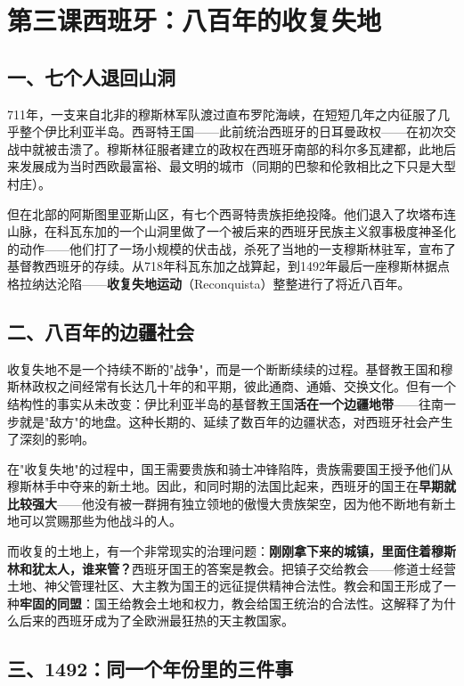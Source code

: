\documentclass[a4paper,12pt]{ctexart}
\begin{document}
\newpage

\section{\textcolor{orange!80!black}{第三课\quad 西班牙：八百年的收复失地}}

\subsection*{一、七个人退回山洞}

711年，一支来自北非的穆斯林军队渡过直布罗陀海峡，在短短几年之内征服了几乎整个伊比利亚半岛。西哥特王国——此前统治西班牙的日耳曼政权——在初次交战中就被击溃了。穆斯林征服者建立的政权在西班牙南部的科尔多瓦建都，此地后来发展成为当时西欧最富裕、最文明的城市（同期的巴黎和伦敦相比之下只是大型村庄）。

但在北部的阿斯图里亚斯山区，有七个西哥特贵族拒绝投降。他们退入了坎塔布连山脉，在科瓦东加的一个山洞里做了一个被后来的西班牙民族主义叙事极度神圣化的动作——他们打了一场小规模的伏击战，杀死了当地的一支穆斯林驻军，宣布了基督教西班牙的存续。从718年科瓦东加之战算起，到1492年最后一座穆斯林据点格拉纳达沦陷——\textbf{收复失地运动}（Reconquista）整整进行了将近八百年。

\subsection*{二、八百年的边疆社会}

收复失地不是一个持续不断的"战争"，而是一个断断续续的过程。基督教王国和穆斯林政权之间经常有长达几十年的和平期，彼此通商、通婚、交换文化。但有一个结构性的事实从未改变：伊比利亚半岛的基督教王国\textbf{活在一个边疆地带}——往南一步就是"敌方"的地盘。这种长期的、延续了数百年的边疆状态，对西班牙社会产生了深刻的影响。

在"收复失地"的过程中，国王需要贵族和骑士冲锋陷阵，贵族需要国王授予他们从穆斯林手中夺来的新土地。因此，和同时期的法国比起来，西班牙的国王在\textbf{早期就比较强大}——他没有被一群拥有独立领地的傲慢大贵族架空，因为他不断地有新土地可以赏赐那些为他战斗的人。

而收复的土地上，有一个非常现实的治理问题：\textbf{刚刚拿下来的城镇，里面住着穆斯林和犹太人，谁来管？}西班牙国王的答案是教会。把镇子交给教会——修道士经营土地、神父管理社区、大主教为国王的远征提供精神合法性。教会和国王形成了一种\textbf{牢固的同盟}：国王给教会土地和权力，教会给国王统治的合法性。这解释了为什么后来的西班牙成为了全欧洲最狂热的天主教国家。

\subsection*{三、1492：同一个年份里的三件事}
\end{document}
